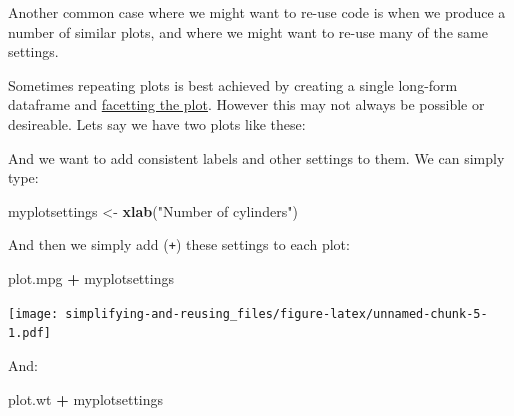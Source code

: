 \documentclass[]{article}
\newenvironment{Shaded}{\begin{snugshade}}{\end{snugshade}}
\newcommand{\KeywordTok}[1]{\textcolor[rgb]{0.13,0.29,0.53}{\textbf{#1}}}
\newcommand{\NormalTok}[1]{#1}
\newcommand{\OperatorTok}[1]{\textcolor[rgb]{0.81,0.36,0.00}{\textbf{#1}}}
\newcommand{\StringTok}[1]{\textcolor[rgb]{0.31,0.60,0.02}{#1}}
\begin{document}
Another common case where we might want to re-use code is when we produce a
number of similar plots, and where we might want to re-use many of the same
settings.

Sometimes repeating plots is best achieved by creating a single long-form
dataframe and \protect\hyperlink{facetting-plots}{facetting the plot}. However this may not
always be possible or desireable. Lets say we have two plots like these:

\begin{Shaded}
\end{Shaded}

And we want to add consistent labels and other settings to them. We can simply
type:

\begin{Shaded}
\begin{Highlighting}[]
\NormalTok{myplotsettings <-}\StringTok{ }\KeywordTok{xlab}\NormalTok{(}\StringTok{"Number of cylinders"}\NormalTok{)}
\end{Highlighting}
\end{Shaded}

And then we simply add (\texttt{+}) these settings to each plot:

\begin{Shaded}
\begin{Highlighting}[]
\NormalTok{plot.mpg }\OperatorTok{+}\StringTok{ }\NormalTok{myplotsettings}
\end{Highlighting}
\end{Shaded}

\texttt{[image: simplifying-and-reusing\_files/figure-latex/unnamed-chunk-5-1.pdf]}

And:

\begin{Shaded}
\begin{Highlighting}[]
\NormalTok{plot.wt }\OperatorTok{+}\StringTok{ }\NormalTok{myplotsettings}
\end{Highlighting}
\end{Shaded}
\end{document}
